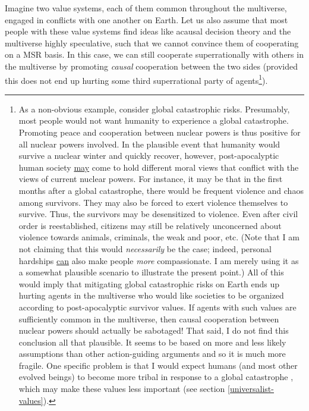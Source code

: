 Imagine two value systems, each of them common throughout the
multiverse, engaged in conflicts with one another on Earth. Let us also
assume that most people with these value systems find ideas like acausal
decision theory and the multiverse highly speculative, such that we
cannot convince them of cooperating on a MSR basis. In this case, we can
still cooperate superrationally with others in the multiverse by
promoting \emph{causal} cooperation between the two sides (provided this
does not end up hurting some third superrational party of
agents\footnote{As a non-obvious example, consider global catastrophic
  risks. Presumably, most people would not want humanity to experience a
  global catastrophe. Promoting peace and cooperation between nuclear
  powers is thus positive for all nuclear powers involved. In the
  plausible event that humanity would survive a nuclear winter and
  quickly recover, however, post-apocalyptic human society
  \href{https://foundational-research.org/how-would-catastrophic-risks-affect-prospects-for-compromise/\#Other_costs_to_catastrophes}{may}
  come to hold different moral views that conflict with the views of
  current nuclear powers. For instance, it may be that in the first
  months after a global catastrophe, there would be frequent violence
  and chaos among survivors. They may also be forced to exert violence
  themselves to survive. Thus, the survivors may be desensitized to
  violence. Even after civil order is reestablished, citizens may still
  be relatively unconcerned about violence towards animals, criminals,
  the weak and poor, etc. (Note that I am not claiming that this would
  \emph{necessarily} be the case; indeed, personal hardships
  \href{http://reducing-suffering.org/how-important-is-experiencing-suffering-for-caring-about-suffering/}{can}
  also make people \emph{more} compassionate. I am merely using it as a
  somewhat plausible scenario to illustrate the present point.) All of
  this would imply that mitigating global catastrophic risks on Earth
  ends up hurting agents in the multiverse who would like societies to
  be organized according to post-apocalyptic survivor values. If agents
  with such values are sufficiently common in the multiverse, then
  causal cooperation between nuclear powers should actually be
  sabotaged! That said, I do not find this conclusion all that
  plausible. It seems to be based on more and less likely assumptions
  than other action-guiding arguments and so it is much more fragile.
  One specific problem is that I would expect humans (and most other
  evolved beings) to become more tribal in response to a global
  catastrophe \parencite{Henrich2015-xe}, which may make
  these values less important (see section
  \ref{universalist-values}).}).

